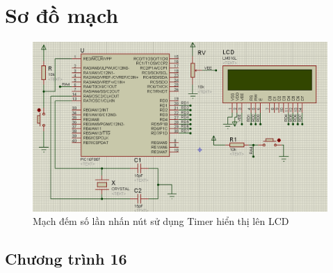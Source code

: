 \section*{Sơ đồ mạch}
\begin{figure}[!h]
\begin{center}
\includegraphics[scale=0.6]{bai-5/image/BAI-5-3}
\end{center}
\caption{Mạch đếm số lần nhấn nút sử dụng Timer hiển thị lên LCD}
\end{figure}
\newpage
\subsection*{Chương trình 16}
